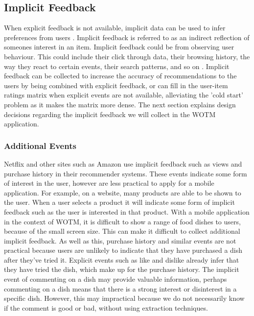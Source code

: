 \subsection{Implicit Feedback}

When explicit feedback is not available, implicit data can be used to infer preferences from users \cite{koren2009matrix}. Implicit feedback is referred to as an indirect reflection of someones interest in an item. Implicit feedback could be from observing user behaviour. This could include their click through data, their browsing history, the way they react to certain events, their search patterns, and so on \cite{koren2009matrix}. Implicit feedback can be collected to increase the accuracy of recommendations to the users by being combined with explicit feedback, or can fill in the user-item ratings matrix when explicit events are not available, alleviating the 'cold start' problem as it makes the matrix more dense. The next section explains design decisions regarding the implicit feedback we will collect in the WOTM application.

\subsubsection{Additional Events}

Netflix and other sites such as Amazon \cite{koren2009matrix, schafer2007collaborative} use implicit feedback such as views and purchase history in their recommender systems. These events indicate some form of interest in the user, however are less practical to apply for a mobile application. For example, on a website, many products are able to be shown to the user. When a user selects a product it will indicate some form of implicit feedback such as the user is interested in that product. With a mobile application in the context of WOTM, it is difficult to show a range of food dishes to users, because of the small screen size. This can make it difficult to collect additional implicit feedback. As well as this, purchase history and similar events are not practical because users are unlikely to indicate that they have purchased a dish after they've tried it. Explicit events such as like and dislike already infer that they have tried the dish, which make up for the purchase history. The implicit event of commenting on a dish may provide valuable information, perhaps commenting on a dish means that there is a strong interest or disinterest in a specific dish. However, this may impractical because we do not necessarily know if the comment is good or bad, without using extraction techniques.

